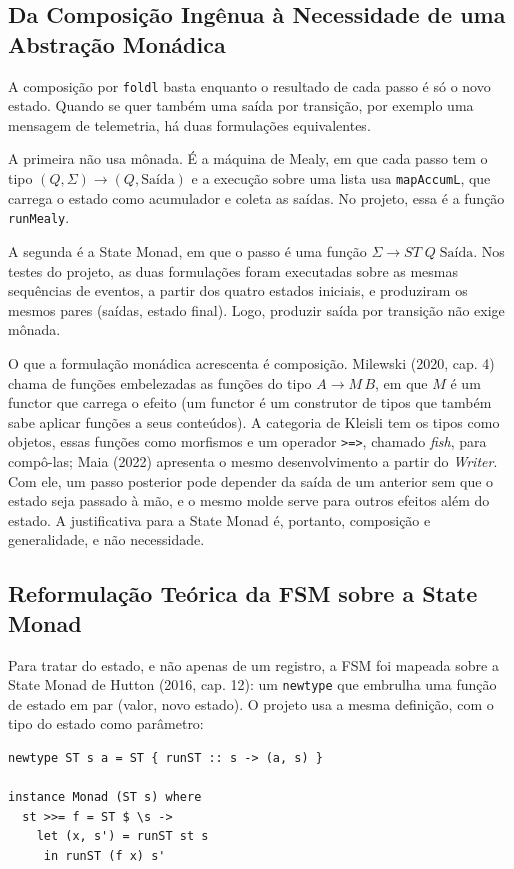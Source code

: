 \documentclass[12pt,a4paper]{article}
\begin{document}
\subsection{Da Composição Ingênua à Necessidade de uma Abstração Monádica}

A composição por \texttt{foldl} basta enquanto o resultado de cada passo é só o novo estado. Quando se quer também uma saída por transição, por exemplo uma mensagem de telemetria, há duas formulações equivalentes.

A primeira não usa mônada. É a máquina de Mealy, em que cada passo tem o tipo $(Q, \Sigma) \to (Q, \text{Saída})$ e a execução sobre uma lista usa \texttt{mapAccumL}, que carrega o estado como acumulador e coleta as saídas. No projeto, essa é a função \texttt{runMealy}.

A segunda é a State Monad, em que o passo é uma função $\Sigma \to ST\;Q\;\text{Saída}$. Nos testes do projeto, as duas formulações foram executadas sobre as mesmas sequências de eventos, a partir dos quatro estados iniciais, e produziram os mesmos pares (saídas, estado final). Logo, produzir saída por transição não exige mônada.

O que a formulação monádica acrescenta é composição. Milewski (2020, cap. 4) chama de funções embelezadas as funções do tipo $A \to M\,B$, em que $M$ é um functor que carrega o efeito (um functor é um construtor de tipos que também sabe aplicar funções a seus conteúdos). A categoria de Kleisli tem os tipos como objetos, essas funções como morfismos e um operador \texttt{>=>}, chamado \textit{fish}, para compô-las; Maia (2022) apresenta o mesmo desenvolvimento a partir do \textit{Writer}. Com ele, um passo posterior pode depender da saída de um anterior sem que o estado seja passado à mão, e o mesmo molde serve para outros efeitos além do estado. A justificativa para a State Monad é, portanto, composição e generalidade, e não necessidade.

\subsection{Reformulação Teórica da FSM sobre a State Monad}

Para tratar do estado, e não apenas de um registro, a FSM foi mapeada sobre a State Monad de Hutton (2016, cap. 12): um \texttt{newtype} que embrulha uma função de estado em par (valor, novo estado). O projeto usa a mesma definição, com o tipo do estado como parâmetro:

\begin{verbatim}
newtype ST s a = ST { runST :: s -> (a, s) }

instance Monad (ST s) where
  st >>= f = ST $ \s ->
    let (x, s') = runST st s
     in runST (f x) s'
\end{verbatim}
\end{document}
